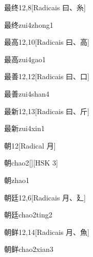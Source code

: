 \begin{entry}{最终}{12,8}[Radicais ⽈、⽷]
  \begin{phonetics}{最终}{zui4zhong1}
  \end{phonetics}
\end{entry}

\begin{entry}{最高}{12,10}[Radicais ⽈、⾼]
  \begin{phonetics}{最高}{zui4gao1}
  \end{phonetics}
\end{entry}

\begin{entry}{最善}{12,12}[Radicais ⽈、⼝]
  \begin{phonetics}{最善}{zui4shan4}
  \end{phonetics}
\end{entry}

\begin{entry}{最新}{12,13}[Radicais ⽈、⽄]
  \begin{phonetics}{最新}{zui4xin1}
  \end{phonetics}
\end{entry}

\begin{entry}{朝}{12}[Radical ⽉]
  \begin{phonetics}{朝}{chao2}[][HSK 3]
  \end{phonetics}
  \begin{phonetics}{朝}{zhao1}
  \end{phonetics}
\end{entry}

\begin{entry}{朝廷}{12,6}[Radicais ⽉、⼵]
  \begin{phonetics}{朝廷}{chao2ting2}
  \end{phonetics}
\end{entry}

\begin{entry}{朝鲜}{12,14}[Radicais ⽉、⿂]
  \begin{phonetics}{朝鲜}{chao2xian3}
  \end{phonetics}
\end{entry}

